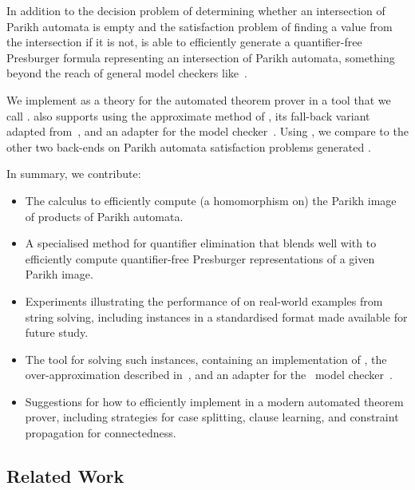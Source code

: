 \documentclass[acmsmall,review,anonymous,screen]{acmart}\settopmatter{printfolios=true,printccs=false,printacmref=true}
\theoremstyle{definition}
\begin{document}
In addition to the decision problem of determining whether an intersection of
Parikh automata is empty and the satisfaction problem of finding a value from
the intersection if it is not, \Catra{} is able to efficiently generate a
quantifier-free Presburger formula representing an intersection of Parikh
automata, something beyond the reach of general model checkers like~\Nuxmv.

We implement \Calculus{} as a theory for the \Princess{} automated theorem
prover in a tool that we call \Catra{}. \Catra also supports using the
approximate method of \cite{approximate-parikh}, its fall-back variant adapted
from~\cite{generate-parikh-image}, and an adapter for the \Nuxmv{} model
checker~\cite{nuxmv}. Using \Catra{}, we compare \Calculus{} to the other two
back-ends on \NrBenchmarks{} Parikh automata satisfaction problems generated
.

In summary, we contribute:
\begin{itemize}
\item The \Calculus{} calculus to efficiently compute (a homomorphism on) the
Parikh image of products of Parikh automata.
\item A specialised method for quantifier elimination that blends well with \Calculus{} to efficiently compute quantifier-free Presburger representations of a given Parikh image. 
\item Experiments illustrating the performance of \Calculus{} on real-world examples from string solving, including \NrBenchmarks{} instances in a standardised format made available for future study.
\item The \Catra{} tool for solving such instances, containing an implementation of \Calculus{}, the over-approximation described in~\cite{approximate-parikh}, and an adapter for the~\Nuxmv{} model checker~\cite{nuxmv}.
\item Suggestions for how to efficiently implement \Calculus{} in a modern automated theorem prover, including strategies for case splitting, clause learning, and constraint propagation for connectedness.
\end{itemize}

\subsection{Related Work}
\end{document}
